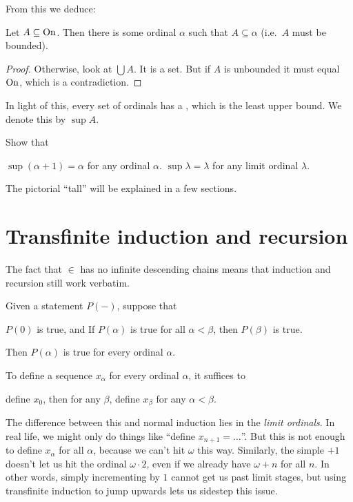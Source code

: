 From this we deduce:
\begin{theorem}
	Let $A \subseteq \mathrm{On}$.
	Then there is some ordinal $\alpha$ such that $A \subseteq \alpha$
	(i.e.\ $A$ must be bounded).
\end{theorem}
\begin{proof}
	Otherwise, look at $\bigcup A$.
	It is a set.
	But if $A$ is unbounded it must equal $\mathrm{On}$,
	which is a contradiction.
\end{proof}
In light of this, every set of ordinals has a ,
which is the least upper bound. We denote this by $\sup A$.

\begin{ques}
	Show that
	\begin{enumerate}[(a)]
		\ii $\sup (\alpha+1) = \alpha$ for any ordinal $\alpha$.
		\ii $\sup \lambda = \lambda$ for any limit ordinal $\lambda$.
	\end{enumerate}
\end{ques}

The pictorial ``tall'' will be explained in a few sections.

\section{Transfinite induction and recursion}
The fact that $\in$ has no infinite descending chains means that induction and recursion still work verbatim.
\begin{theorem}
	Given a statement $P(-)$, suppose that
	\begin{itemize}
		\ii $P(0)$ is true, and
		\ii If $P(\alpha)$ is true for all $\alpha < \beta$, then $P(\beta)$ is true.
	\end{itemize}
	Then $P(\alpha)$ is true for every ordinal $\alpha$.
\end{theorem}
\begin{theorem}
	To define a sequence $x_\alpha$ for every ordinal $\alpha$,
	it suffices to
	\begin{itemize}
		\ii define $x_0$, then
		\ii for any $\beta$, define $x_\beta$ for any $\alpha < \beta$.
	\end{itemize}
\end{theorem}

The difference between this and normal induction lies in the \emph{limit ordinals}.
In real life, we might only do things like ``define $x_{n+1} = \dots$''.
But this is not enough to define $x_\alpha$ for all $\alpha$,
because we can't hit $\omega$ this way.
Similarly, the simple $+1$ doesn't let us hit the ordinal $\omega \cdot 2$,
even if we already have $\omega+n$ for all $n$.
In other words, simply incrementing by $1$ cannot get us past limit stages,
but using transfinite induction to jump upwards lets us sidestep this issue.

